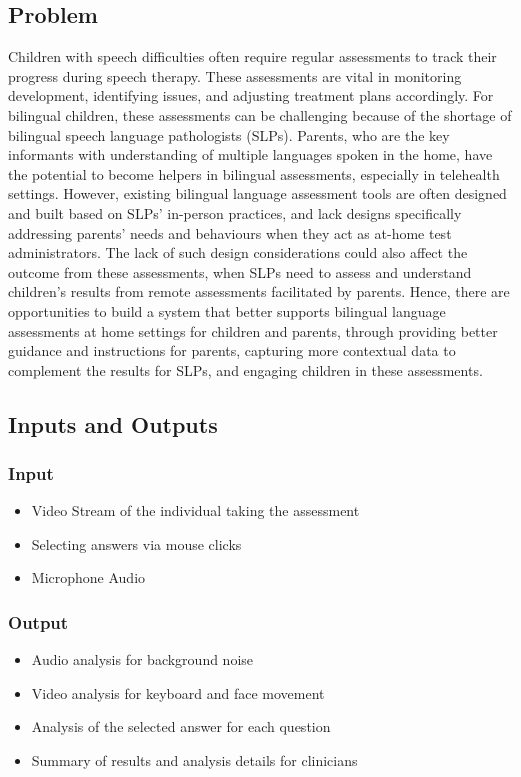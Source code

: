 \documentclass{article}
\begin{document}
\subsection{Problem}
\hspace{2em}Children with speech difficulties often require regular assessments to track their progress
during speech therapy. These assessments are vital in monitoring development, identifying issues, and
adjusting treatment plans accordingly. For bilingual children, these assessments can be challenging
because of the shortage of bilingual  speech language pathologists (SLPs).  Parents, who are the key
informants with understanding of multiple languages spoken in the home, have the potential to become
helpers in bilingual assessments, especially in telehealth settings. However, existing bilingual language
assessment tools are often designed and built based on SLPs’ in-person practices, and lack designs
specifically addressing parents’ needs and behaviours when they act as at-home test administrators. The lack of such design
considerations could also affect the outcome from these assessments, when SLPs need to assess and understand
children’s results from remote assessments facilitated by parents. Hence, there are opportunities to build a
system that better supports bilingual language assessments at home settings for children and parents, through
providing better guidance and instructions for parents, capturing more contextual data to complement the
results for SLPs, and engaging children in these assessments.


\subsection{Inputs and Outputs}
\subsubsection{Input}
\begin{itemize}
\item Video Stream of the individual taking the assessment
\item Selecting answers via mouse clicks
\item Microphone Audio
\end{itemize}
\subsubsection{Output}
\begin{itemize}
\item Audio analysis for background noise
\item Video analysis for keyboard and face movement
\item Analysis of the selected answer for each question
\item Summary of results and analysis details for clinicians
\end{itemize}
\end{document}
